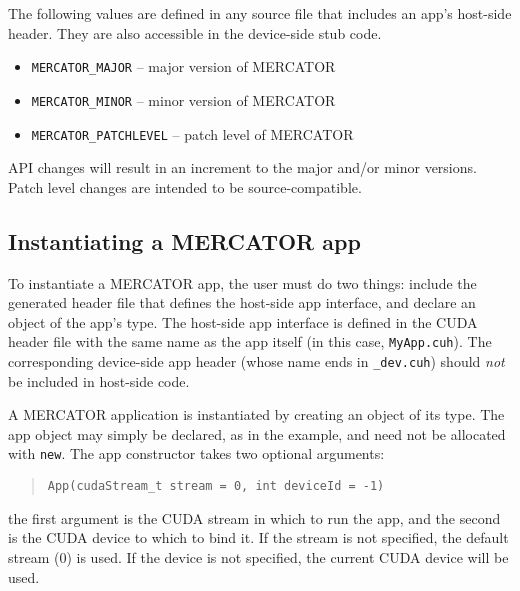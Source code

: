 \documentclass[11pt]{article}
\begin{document}
The following values are defined in any source file that includes an
app's host-side header.  They are also accessible in the device-side
stub code.

\begin{itemize}

\item \texttt{MERCATOR_MAJOR} -- major version of MERCATOR

\item \texttt{MERCATOR_MINOR} -- minor version of MERCATOR

\item \texttt{MERCATOR_PATCHLEVEL} -- patch level of MERCATOR

\end{itemize}

API changes will result in an increment to the major and/or minor
versions.  Patch level changes are intended to be source-compatible.


\subsection{Instantiating a MERCATOR app}

To instantiate a MERCATOR app, the user must do two things: include
the generated header file that defines the host-side app interface,
and declare an object of the app's type.  The host-side app interface
is defined in the CUDA header file with the same name as the app
itself (in this case, \texttt{MyApp.cuh}).  The corresponding
device-side app header (whose name ends in \texttt{_dev.cuh}) should
\emph{not} be included in host-side code.


A MERCATOR application is instantiated by creating an object of its
type.  The app object may simply be declared, as in the example, and
need not be allocated with \texttt{new}.  The app constructor takes
two optional arguments:
\begin{quote}
\texttt{App(cudaStream_t stream = 0, int deviceId = -1)}
\end{quote}
the first argument is the CUDA stream in which to run the app, and
the second is the CUDA device to which to bind it.  If the stream is
not specified, the default stream (0) is used.  If the device is not
specified, the current CUDA device will be used.
\end{document}
